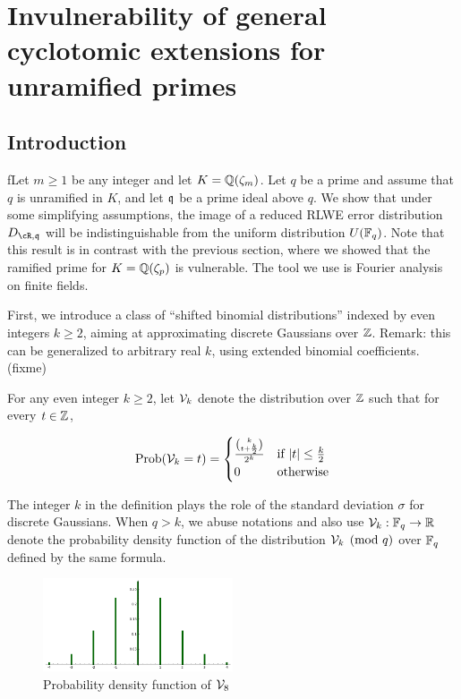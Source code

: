 \documentclass{amsart}
\begin{document}
\section{Invulnerability of general cyclotomic extensions for unramified primes}
\label{sec: cyclo-secure}

\subsection{Introduction}

fLet $m \geq 1$ be any integer and let $K = \mathbb{Q}(\zeta_m)$. Let $q$ be a prime and assume that $q$ is unramified in $K$, and let $\mathfrak{q}$ be a prime ideal above $q$. We show that under some simplifying assumptions, the image of a reduced RLWE error distribution $D_{\cR,\fq}$ will be indistinguishable from the uniform distribution $U(\mathbb{F}_q)$. Note that this result is in contrast with the previous section, where we showed that the ramified prime for
$K = \mathbb{Q}(\zeta_p)$ is vulnerable. The tool we use is Fourier analysis on finite fields.

First, we introduce a class of ``shifted binomial distributions'' indexed by even integers $k \geq 2$, aiming at approximating discrete Gaussians over $\mathbb{Z}$. Remark: this can be generalized to
arbitrary real $k$, using extended binomial coefficients. (fixme)
\begin{Definition}
For any even integer $k \geq 2$, let $\mathcal{V}_k$ denote the distribution over $\mathbb{Z}$ such that for every $t \in \mathbb{Z}$,

$$\operatorname{Prob}(\mathcal{V}_k = t) =  \begin{cases} \frac{{k \choose t+\frac{k}{2}}}{2^k} &\mbox{if } |t| \leq \frac{k}{2} \\
0 & \mbox{otherwise}  \end{cases}$$

\end{Definition}
The integer $k$ in the definition plays the role of the standard deviation $\sigma$ for discrete Gaussians. When $q > k$, we abuse notations and also use $\mathcal{V}_k: \mathbb{F}_q \to \mathbb{R}$ denote the probability density function of the distribution $\mathcal{V}_k \pmod {q}$ over $\mathbb{F}_q$ defined by the same formula.

\begin{figure}[h!]
\centering
\includegraphics[width = 0.5\textwidth]{v8.png}
\caption{Probability density function of $\mathcal{V}_8$}
\end{figure}
\end{document}
